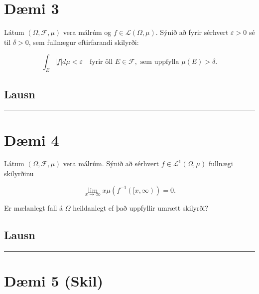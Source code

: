 \documentclass[]{book}
\begin{document}
\hypertarget{dmi-3-6}{%
\section*{Dæmi 3}\label{dmi-3-6}}

Látum \((\Omega,\mathcal F,\mu)\) vera málrúm og \(f\in\mathcal L(\Omega,\mu)\). Sýnið að fyrir sérhvert \(\varepsilon > 0\) sé til \(\delta > 0\), sem fullnægur eftirfarandi skilyrði:

\[
\int_E |f|d\mu < \varepsilon \quad \text{fyrir öll } E\in\mathcal F, \text{ sem uppfylla } \mu(E)>\delta.
\]

\hypertarget{lausn-3}{%
\subsection*{Lausn}\label{lausn-3}}

\begin{center}\rule{0.5\linewidth}{\linethickness}\end{center}

\hypertarget{dmi-4-6}{%
\section*{Dæmi 4}\label{dmi-4-6}}

Látum \((\Omega,\mathcal F,\mu)\) vera málrúm. Sýnið að sérhvert \(f\in\mathcal L^1(\Omega,\mu)\) fullnægi skilyrðinu

\[
\lim_{x\rightarrow\infty}x\mu(f^{-1}([x,\infty)) = 0.
\]

Er mælanlegt fall á \(\Omega\) heildanlegt ef það uppfyllir umrætt skilyrði?

\hypertarget{lausn-4}{%
\subsection*{Lausn}\label{lausn-4}}

\begin{center}\rule{0.5\linewidth}{\linethickness}\end{center}

\hypertarget{dmi-5-skil}{%
\section*{Dæmi 5 (Skil)}\label{dmi-5-skil}}
\end{document}
